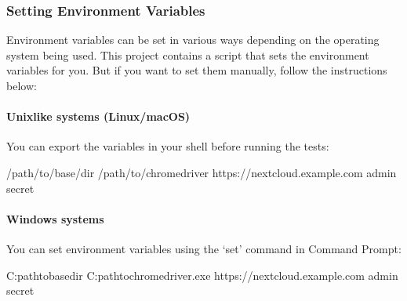 \documentclass[letterpaper,10pt,english]{sphinxmanual}
\begin{document}
\subsubsection{Setting Environment Variables}
\label{\detokenize{config:setting-environment-variables}}
\sphinxAtStartPar
Environment variables can be set in various ways depending on the operating system being used. This project contains a script that sets the environment variables for you. But if you want to set them manually, follow the instructions below:


\paragraph{Unix\sphinxhyphen{}like systems (Linux/macOS)}
\label{\detokenize{config:unix-like-systems-linux-macos}}
\sphinxAtStartPar
You can export the variables in your shell before running the tests:

\begin{sphinxVerbatim}[commandchars=\\\{\}]
/path/to/base/dir
/path/to/chromedriver
https://nextcloud.example.com
admin
secret
\end{sphinxVerbatim}


\paragraph{Windows systems}
\label{\detokenize{config:windows-systems}}
\sphinxAtStartPar
You can set environment variables using the ‘set’ command in Command Prompt:

\begin{sphinxVerbatim}[commandchars=\\\{\}]
 C:\PYGZbs{}path\PYGZbs{}to\PYGZbs{}base\PYGZbs{}dir
 C:\PYGZbs{}path\PYGZbs{}to\PYGZbs{}chromedriver.exe
 https://nextcloud.example.com
 admin
 secret
\end{sphinxVerbatim}
\end{document}
